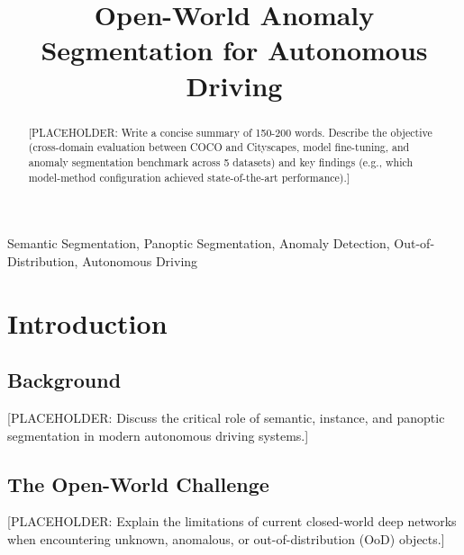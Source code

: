 \documentclass[10pt,conference]{IEEEtran}
\begin{document}
\title{Open-World Anomaly Segmentation for Autonomous Driving}

\author{
\and
{}
}

\maketitle

\begin{abstract}
[PLACEHOLDER: Write a concise summary of 150-200 words. Describe the objective (cross-domain evaluation between COCO and Cityscapes, model fine-tuning, and anomaly segmentation benchmark across 5 datasets) and key findings (e.g., which model-method configuration achieved state-of-the-art performance).]
\end{abstract}

\begin{IEEEkeywords}
Semantic Segmentation, Panoptic Segmentation, Anomaly Detection, Out-of-Distribution, Autonomous Driving
\end{IEEEkeywords}

\section{Introduction}

\subsection{Background}
[PLACEHOLDER: Discuss the critical role of semantic, instance, and panoptic segmentation in modern autonomous driving systems.]

\subsection{The Open-World Challenge}
[PLACEHOLDER: Explain the limitations of current closed-world deep networks when encountering unknown, anomalous, or out-of-distribution (OoD) objects.]
\end{document}

